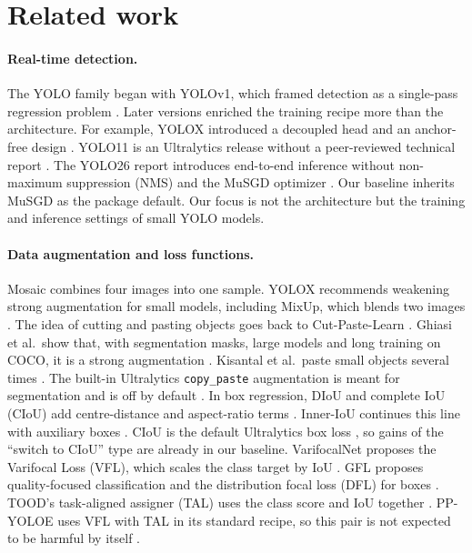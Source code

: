 \documentclass[pdflatex,iicol,sn-mathphys-num]{sn-jnl}
\begin{document}
\section{Related work}\label{sec:ilgili}

\paragraph{Real-time detection.}
The YOLO family began with YOLOv1, which framed detection as a single-pass regression problem \cite{redmon_2016_yolo}. Later versions enriched the training recipe more than the architecture. For example, YOLOX introduced a decoupled head and an anchor-free design \cite{ge_2021_yolox}. YOLO11 is an Ultralytics release without a peer-reviewed technical report \cite{jocher_2024_yolo11}. The YOLO26 report introduces end-to-end inference without non-maximum suppression (NMS) and the MuSGD optimizer \cite{jocher_2026_yolo26}. Our baseline inherits MuSGD as the package default. Our focus is not the architecture but the training and inference settings of small YOLO models.

\paragraph{Data augmentation and loss functions.}
Mosaic combines four images into one sample. YOLOX recommends weakening strong augmentation for small models, including MixUp, which blends two images \cite{ge_2021_yolox}. The idea of cutting and pasting objects goes back to Cut-Paste-Learn \cite{dwibedi_2017_cutpaste}. Ghiasi et al.\ show that, with segmentation masks, large models and long training on COCO, it is a strong augmentation \cite{ghiasi_2021_copypaste}. Kisantal et al.\ paste small objects several times \cite{kisantal_2019_smallaug}. The built-in Ultralytics \texttt{copy\_paste} augmentation is meant for segmentation and is off by default \cite{ultralytics_2026_v84165}. In box regression, DIoU and complete IoU (CIoU) add centre-distance and aspect-ratio terms \cite{zheng_2020_diou}. Inner-IoU continues this line with auxiliary boxes \cite{zhang_2023_inneriou}. CIoU is the default Ultralytics box loss \cite{ultralytics_2026_v84165}, so gains of the ``switch to CIoU'' type are already in our baseline. VarifocalNet proposes the Varifocal Loss (VFL), which scales the class target by IoU \cite{zhang_2021_varifocalnet}. GFL proposes quality-focused classification and the distribution focal loss (DFL) for boxes \cite{li_2020_gfl}. TOOD's task-aligned assigner (TAL) uses the class score and IoU together \cite{feng_2021_tood}. PP-YOLOE uses VFL with TAL in its standard recipe, so this pair is not expected to be harmful by itself \cite{xu_2022_ppyoloe}.
\end{document}
